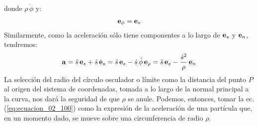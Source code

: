 donde $\rho \, \dot{\phi}$ y:
\begin{align}
    \vb{e}_{\phi} = \vb{e}_{s}
    \label{eq:ecuacion_02_105}
\end{align} 
Similarmente, como la aceleración sólo tiene componentes a lo largo de $\vb{e}_{s}$ y $\vb{e}_{n}$, tendremos:
\begin{align}
    \vb{a} = \ddot{s} \, \vb{e}_{s} + \dot{s} \, \dot{\vb{e}}_{s} = \ddot{s} \, \vb{e}_{s} - \dot{s} \, \dot{\phi} \, \vb{e}_{\rho} = \ddot{s} \, \vb{e}_{s} - \dfrac{\dot{s}^{2}}{\rho} \, \vb{e}_{n}
    \label{eq:ecuacion_02_106}
\end{align}
La selección del radio del círculo osculador o límite como la distancia del punto $P$ al origen del sistema de coordenadas, tomada a lo largo de la normal principal a la curva, nos dará la seguridad de que $\rho$ se anule. Podemos, entonces, tomar la ec. (\ref{eq:ecuacion_02_100}) como la expresión de la aceleración de una partícula que, en un momento dado, se mueve sobre una circunferencia de radio $\rho$.